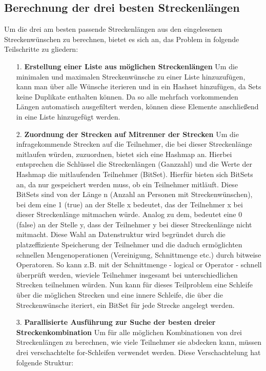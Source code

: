 \documentclass[a4paper,10pt,ngerman]{scrartcl}
\begin{document}
\subsection{Berechnung der drei besten Streckenlängen}
Um die drei am besten passende Streckenlängen aus den eingelesenen Streckenwünschen zu berechnen, bietet es sich an, das Problem in folgende Teilschritte zu gliedern:
\begin{itemize}
  \item [1.] \textbf{Erstellung einer Liste aus möglichen Streckenlängen}
  \newline
  Um die minimalen und maximalen Streckenwünsche zu einer Liste hinzuzufügen, kann man über alle Wünsche iterieren und in ein Hashset hinzufügen, da Sets keine Duplikate enthalten können. Da so alle mehrfach vorkommenden Längen automatisch ausgefiltert werden, können diese Elemente anschließend 
  in eine Liste hinzugefügt werden.
  \item [2.] \textbf{Zuordnung der Strecken auf Mitrenner der Strecken}
  \newline
  Um die infragekommende Strecken auf die Teilnehmer, die bei dieser Streckenlänge mitlaufen würden, zuzuordnen, bietet sich eine Hashmap an. Hierbei entsprechen die Schlüssel die Streckenlängen (Ganzzahl) und die Werte der Hashmap die mitlaufenden Teilnehmer (BitSet). Hierfür bieten sich BitSets an, da nur
  gespeichert werden muss, ob ein Teilnehmer mitläuft. Diese BitSets sind von der Länge n (Anzahl an Personen mit Streckenwünschen), bei dem eine 1 (true) an der Stelle x bedeutet, das der Teilnehmer x bei dieser Streckenlänge mitmachen würde.
  Analog zu dem, bedeutet eine 0 (false) an der Stelle y, dass der Teilnehmer y bei dieser Streckenlänge nicht mitmacht. Diese Wahl an Datenstruktur wird begründet durch die platzeffiziente Speicherung der Teilnehmer und die daduch ermöglichten schnellen
  Mengenoperationen (Vereinigung, Schnittmenge etc.) durch bitweise Operatoren. So kann z.B. mit der Schnittmenge - logical or Operator - schnell überprüft werden, wieviele Teilnehmer insgesamt bei unterschiedlichen Strecken teilnehmen würden. 
  Nun kann für dieses Teilproblem eine Schleife über die möglichen Strecken und eine innere Schleife, die über die Streckenwünsche iteriert, ein BitSet für jede Strecke angelegt werden.
  \item [3.] \textbf{Parallisierte Ausführung zur Suche der besten dreier Streckenkombination}
  \newline
  Um für alle möglichen Kombinationen von drei Streckenlängen zu berechnen, wie viele Teilnehmer sie abdecken kann, müssen drei verschachtelte for-Schleifen verwendet werden. Diese Verschachtelung hat folgende Struktur:

\end{itemize}
\end{document}
